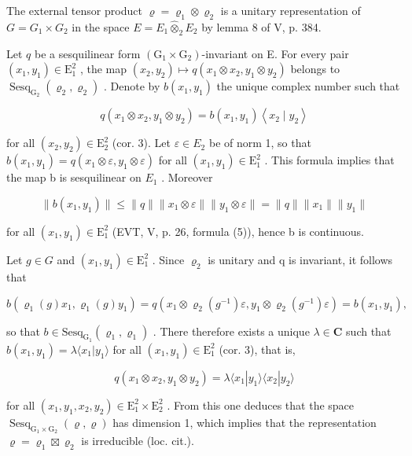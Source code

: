 The external tensor product \(\varrho = \varrho_{1} \otimes \varrho_{2}\) is a unitary representation of \(G = G_{1} \times G_{2}\) in the space \(E = E_{1} \widehat{\otimes}_{2} E_{2}\) by lemma 8 of V, p. 384.

Let \(q\) be a sesquilinear form \((\mathrm{G}_1 \times \mathrm{G}_2)\)-invariant on E. For every pair \((x_1, y_1) \in \mathrm{E}_1^2\) , the map \((x_2, y_2) \mapsto q(x_1 \otimes x_2, y_1 \otimes y_2)\) belongs to \(\operatorname{Sesq}_{\mathrm{G}_2}(\varrho_2, \varrho_2)\) . Denote by \(b(x_1, y_1)\) the unique complex number such that

\[
q (x _ {1} \otimes x _ {2}, y _ {1} \otimes y _ {2}) = b (x _ {1}, y _ {1}) \left\langle x _ {2} \mid y _ {2} \right\rangle
\]

for all \((x_{2},y_{2})\in\mathrm{E}_{2}^{2}\) (cor. 3). Let \(\varepsilon\in E_{2}\) be of norm 1, so that \(b(x_{1},y_{1})=q(x_{1}\otimes\varepsilon,y_{1}\otimes\varepsilon)\) for all \((x_{1},y_{1})\in\mathrm{E}_{1}^{2}\) . This formula implies that the map b is sesquilinear on \(E_{1}\) . Moreover

\[
\| b (x _ {1}, y _ {1}) \| \leqslant \| q \| \| x _ {1} \otimes \varepsilon \| \| y _ {1} \otimes \varepsilon \| = \| q \| \| x _ {1} \| \| y _ {1} \|
\]

for all \((x_{1},y_{1})\in\mathrm{E}_{1}^{2}\) (EVT, V, p. 26, formula (5)), hence b is continuous.

Let \(g \in G\) and \((x_{1}, y_{1}) \in \mathrm{E}_{1}^{2}\) . Since \(\varrho_{2}\) is unitary and q is invariant, it follows that

\[
b \left(\varrho_ {1} (g) x _ {1}, \varrho_ {1} (g) y _ {1}\right) = q \left(x _ {1} \otimes \varrho_ {2} \left(g ^ {- 1}\right) \varepsilon , y _ {1} \otimes \varrho_ {2} \left(g ^ {- 1}\right) \varepsilon\right) = b \left(x _ {1}, y _ {1}\right),
\]

so that \(b \in \mathrm{Sesq}_{\mathrm{G}_1}(\varrho_1, \varrho_1)\) . There therefore exists a unique \(\lambda \in \mathbf{C}\) such that \(b(x_1, y_1) = \lambda \langle x_1 | y_1 \rangle\) for all \((x_1, y_1) \in \mathrm{E}_1^2\) (cor. 3), that is,

\[
q (x _ {1} \otimes x _ {2}, y _ {1} \otimes y _ {2}) = \lambda \langle x _ {1} | y _ {1} \rangle \langle x _ {2} | y _ {2} \rangle
\]

for all \((x_{1},y_{1},x_{2},y_{2})\in\mathrm{E}_{1}^{2}\times\mathrm{E}_{2}^{2}\) . From this one deduces that the space \(\operatorname{Sesq}_{\mathrm{G}_{1}\times\mathrm{G}_{2}}(\varrho,\varrho)\) has dimension 1, which implies that the representation \(\varrho=\varrho_{1}\boxtimes\varrho_{2}\) is irreducible (loc. cit.).

